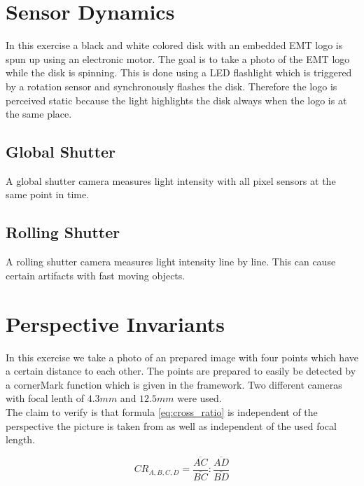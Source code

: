 \documentclass[
a4paper,     %
12pt         %
]{scrartcl}  %
\begin{document}
\pagebreak

\section{Sensor Dynamics}

In this exercise a black and white colored disk with an embedded EMT logo is spun up using an electronic motor.
The goal is to take a photo of the EMT logo while the disk is spinning.
This is done using a LED flashlight which is triggered by a rotation sensor and synchronously flashes the disk.
Therefore the logo is perceived static because the light highlights the disk always when the logo is at the same place.

\subsection{Global Shutter}

A global shutter camera measures light intensity with all pixel sensors at the same point in time.

\subsection{Rolling Shutter}

A rolling shutter camera measures light intensity line by line.
This can cause certain artifacts with fast moving objects.

\pagebreak
\section{Perspective Invariants}

In this exercise we take a photo of an prepared image with four points which have a certain distance to each other.
The points are prepared to easily be detected by a cornerMark function which is given in the framework.
Two different cameras with focal lenth of $4.3mm$ and $12.5mm$ were used.\\

\noindent
The claim to verify is that formula \ref{eq:cross_ratio} is independent of the perspective the picture is taken from as well as independent of the used focal length.

\begin{equation}
 CR_{A,B,C,D} = \frac{\overline{AC}}{\overline{BC}} : \frac{\overline{AD}}{\overline{BD}}
 \label{eq:cross_ratio}
\end{equation}
\end{document}
